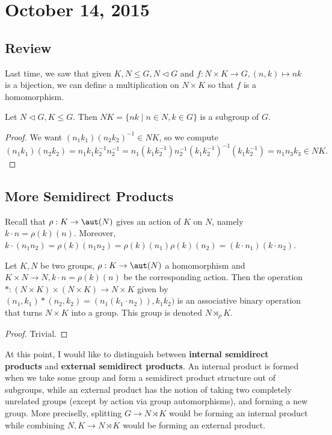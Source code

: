 \section{October 14, 2015}

\subsection{Review}
Last time, we saw that given $K, N \leq G, N \lhd G$ and $f : N \times K
\to G, (n, k) \mapsto nk$ is a bijection, we can define a multiplication
on $N \times K$ so that $f$ is a homomorphism.

\begin{lem}
Let $N \lhd G, K \leq G$. Then $NK = \lbrace nk \mid n \in N, k \in G
\rbrace$ is a subgroup of $G$.
\end{lem}

\begin{proof}
We want $(n_1 k_1)(n_2 k_2)^{-1} \in NK$, so we compute
\[ (n_1 k_1)(n_2 k_2) = n_1 k_1 k_2^{-1} n_2^{-1} = n_1 (k_1 k_2^{-1})
n_2^{-1} (k_1 k_2^{-1})^{-1} (k_1 k_2^{-1}) = n_1 n_3 k_3 \in NK. \]
\end{proof}

\subsection{More Semidirect Products}
Recall that $\rho : K \to \aut(N)$ gives an action of $K$ on $N$, namely
$k \cdot n = \rho(k)(n)$. Moreover, $k \cdot (n_1 n_2) = \rho(k)(n_1
n_2) = \rho(k)(n_1) \rho(k)(n_2) = (k \cdot n_1)(k \cdot n_2)$.

\begin{thm}
\label{externalsemiprod}
Let $K, N$ be two groups, $\rho : K \to \aut(N)$ a homomorphism and $K
\times N \to N, k \cdot n = \rho(k)(n)$ be the corresponding action.
Then the operation $* : (N \times K) \times (N \times K) \to N \times K$
given by $(n_1, k_1) * (n_2, k_2) = (n_1 (k_1 \cdot n_2)), k_1 k_2)$ is
an associative binary operation that turns $N \times K$ into a group.
This group is denoted $N \rtimes_\rho K$.
\end{thm}

\begin{proof}
Trivial.
\end{proof}

\begin{note}
At this point, I would like to distinguish between \textbf{internal
semidirect products} and \textbf{external semidirect products}. An
internal product is formed when we take some group and form a semidirect
product structure out of subgroups, while an external product has the
notion of taking two completely unrelated groups (except by action via
group automorphisms), and forming a new group. More preciselly,
splitting $G \to N \rtimes K$ would be forming an internal product while
combining $N, K \to N \rtimes K$ would be forming an external product.
\end{note}

